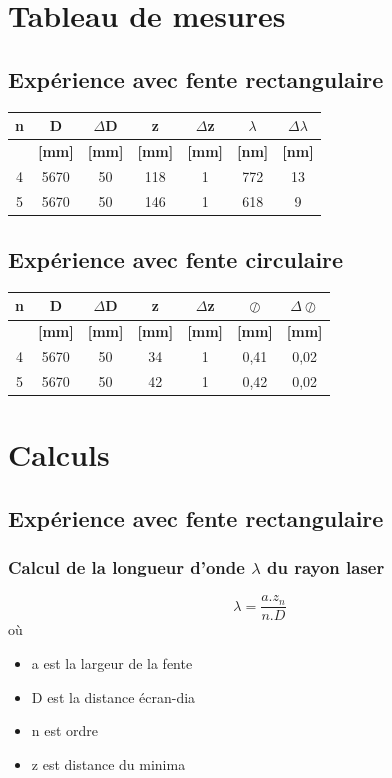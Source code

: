 \documentclass[11pt,a4paper]{report}
\begin{document}
	\section{Tableau de mesures}
	\subsection{Expérience avec fente rectangulaire}
	\begin{center}	
	\begin{tabular}{|c|c|c|c|c|c|c|}
		\hline
		\bf n & \bf D & \bf $\Delta$D & \bf z & \bf $\Delta$z & \bf $\lambda$& \bf $\Delta\lambda$ \\
		\hline
		 & \bf [mm] & \bf [mm] & \bf [mm] & \bf [mm] & \bf [nm]  & \bf [nm] \\
		\hline
		4 & 5670 & 50 & 118 &  1 & 772 &  13\\
		5 & 5670 & 50 & 146 &  1 & 618 &  9\\
		\hline
	\end{tabular}
	\end{center}
	\subsection{Expérience avec fente circulaire}
	\begin{center}
	
	\begin{tabular}{|c|c|c|c|c|c|c|}
		\hline
		\bf n & \bf D & \bf $\Delta$D & \bf z & \bf $\Delta$z & \bf $\oslash$& \bf $\Delta\oslash$ \\
		\hline
		 & \bf [mm] & \bf [mm] & \bf [mm] & \bf [mm] & \bf [mm]  & \bf [mm] \\
		\hline
		4 & 5670 & 50 & 34&  1 &0,41 & 0,02 \\
		5 & 5670 & 50 & 42&  1 &0,42 & 0,02\\
		\hline
	\end{tabular}
	\end{center}	
	\section{Calculs}
		\subsection{Expérience avec fente rectangulaire}
		\subsubsection{Calcul de la longueur d'onde $\lambda$ du rayon laser}
		\begin{equation}
		\lambda = \frac{a.z_{n}}{n.D}		
		\end{equation}		 
		où
		 \begin{itemize}
		  \item a est la largeur de la fente
		  \item D est la distance écran-dia
		  \item n est ordre
		  \item z est distance du minima 
		 \end{itemize}
\end{document}
